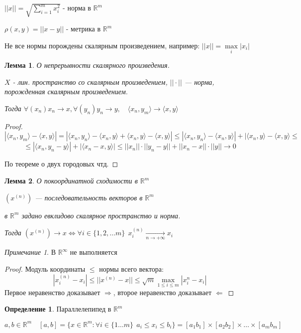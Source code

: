 \documentclass[12pt]{article}
\theoremstyle{plain}
\newtheorem{lemma}{Лемма}
\theoremstyle{remark}
\newtheorem*{remark}{Примечание}
\theoremstyle{definition}
\newtheorem*{definition}{Определение}
\begin{document}
$||x|| = \sqrt{\sum\limits_{i=1}^m x_i^2}$ - норма в $\mathbb{R}^m$

$\rho(x,y)=||x-y||$ - метрика в $\mathbb{R}^m$

Не все нормы порождены скалярным произведением, например: $||x||=\max\limits_i |x_i|$

\begin{lemma}
    О непрерывности скалярного произведения.

    $X$ - лин. пространство со скалярным произведением, $||\cdot||$ --- норма, порожденная скалярным произведением.

    Тогда $\forall (x_n) x_n\to x, \forall (y_n) y_n\to y, \quad \langle x_n,y_m\rangle\to\langle x,y\rangle$
\end{lemma}

\begin{proof}
    $$|\langle x_n,y_m\rangle - \langle x,y\rangle|=|\langle x_n,y_n\rangle - \langle x_n,y\rangle + \langle x_n,y\rangle - \langle x,y\rangle|\leq|\langle x_n,y_n\rangle-\langle x_n,y\rangle| + |\langle x_n,y\rangle-\langle x,y\rangle\leq$$
    $$\leq |\langle x_n,y_n-y\rangle| + |\langle x_n-x,y\rangle|\leq ||x_n||\cdot||y_n-y||+||x_n-x||\cdot||y|| \to 0$$

    По теореме о двух городовых чтд.
\end{proof}

\begin{lemma}
    О покоординатной сходимости в $\mathbb{R}^m$

    $(x^{(n)})$ --- последовательность векторов в $\mathbb{R}^m$
    
    в $\mathbb{R}^m$ задано евклидово скалярное пространство и норма.

    Тогда $(x^{(n)})\to x \Leftrightarrow \forall i\in\{1,2,\ldots m\} \ \ x_i^{(n)}\underset{n\to+\infty}\to x_i$
\end{lemma}

\begin{remark}
    В $\mathbb{R}^{\infty}$ не выполняется
\end{remark}

\begin{proof}
    Модуль координаты $\leq$ нормы всего вектора:
    $$|x_i^{(n)}-x_i|\leq ||x^{(n)}-x||\leq \sqrt{m}\max\limits_{1\leq i\leq m} |x_i^{n}-x_i|$$
    Первое неравенство доказывает $\Rightarrow$, второе неравенство доказывает $\Leftarrow$
\end{proof}

\begin{definition}
    Параллелепипед в $\mathbb{R}^m$

    $a,b\in\mathbb{R}^m \quad [a,b]=\{x \in\mathbb{R}^m : \forall i\in\{1\ldots m\} \ \ a_i\leq x_i\leq b_i \} = [a_1b_1]\times[a_2b_2]\times\ldots\times[a_mb_m]$
\end{definition}
\end{document}
